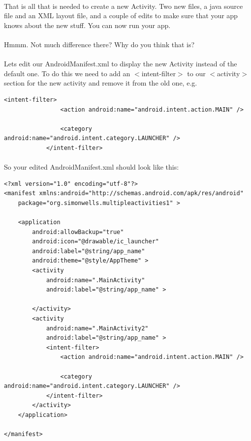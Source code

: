 \documentclass[12pt, a4paper, twoside]{book}
\begin{document}
\paragraph{} That is all that is needed to create a new Activity. Two new files, a java source file and an XML layout file, and a couple of edits to make sure that your app knows about the new stuff. You can now run your app.

\paragraph{} Hmmm. Not much difference there? Why do you think that is? 

\paragraph{} Lets edit our AndroidManifest.xml to display the new Activity instead of the default one. To do this we need to add an $<$intent-filter$>$ to our $<$activity$>$ section for the new activity and remove it from the old one, e.g.

\begin{lstlisting}
<intent-filter>
                <action android:name="android.intent.action.MAIN" />

                <category android:name="android.intent.category.LAUNCHER" />
            </intent-filter>
\end{lstlisting}

\paragraph{} So your edited AndroidManifest.xml should look like this:

\begin{lstlisting}
<?xml version="1.0" encoding="utf-8"?>
<manifest xmlns:android="http://schemas.android.com/apk/res/android"
    package="org.simonwells.multipleactivities1" >

    <application
        android:allowBackup="true"
        android:icon="@drawable/ic_launcher"
        android:label="@string/app_name"
        android:theme="@style/AppTheme" >
        <activity
            android:name=".MainActivity"
            android:label="@string/app_name" >

        </activity>
        <activity
            android:name=".MainActivity2"
            android:label="@string/app_name" >
            <intent-filter>
                <action android:name="android.intent.action.MAIN" />

                <category android:name="android.intent.category.LAUNCHER" />
            </intent-filter>
        </activity>
    </application>

</manifest>
\end{lstlisting}
\end{document}
